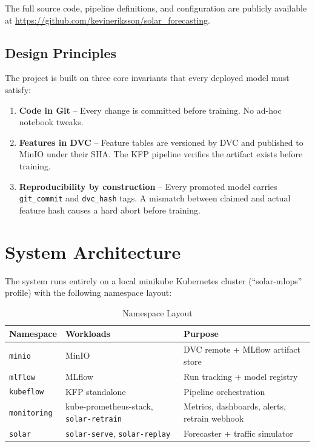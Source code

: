 \documentclass[11pt,a4paper]{article}
\begin{document}
The full source code, pipeline definitions, and configuration are publicly available at \url{https://github.com/kevineriksson/solar\_forecasting}.

\subsection{Design Principles}

The project is built on three core invariants that every deployed model must satisfy:

\begin{enumerate}[label=\textbf{Invariant \arabic*:}, leftmargin=*]
    \item \textbf{Code in Git} -- Every change is committed before training. No ad-hoc notebook tweaks.
    \item \textbf{Features in DVC} -- Feature tables are versioned by DVC and published to MinIO under their SHA. The KFP pipeline verifies the artifact exists before training.
    \item \textbf{Reproducibility by construction} -- Every promoted model carries \texttt{git\_commit} and \texttt{dvc\_hash} tags. A mismatch between claimed and actual feature hash causes a hard abort before training.
\end{enumerate}

\section{System Architecture}

The system runs entirely on a local minikube Kubernetes cluster (``solar-mlops'' profile) with the following namespace layout:

\begin{table}[H]
\centering
\begin{tabular}{@{}lll@{}}
\toprule
\textbf{Namespace} & \textbf{Workloads} & \textbf{Purpose} \\
\midrule
\texttt{minio}     & MinIO              & DVC remote + MLflow artifact store \\
\texttt{mlflow}    & MLflow             & Run tracking + model registry \\
\texttt{kubeflow}  & KFP standalone     & Pipeline orchestration \\
\texttt{monitoring}& kube-prometheus-stack, \texttt{solar-retrain} & Metrics, dashboards, alerts, retrain webhook \\
\texttt{solar}     & \texttt{solar-serve}, \texttt{solar-replay} & Forecaster + traffic simulator \\
\bottomrule
\end{tabular}
\caption{Namespace Layout}
\label{tab:namespaces}
\end{table}
\end{document}
